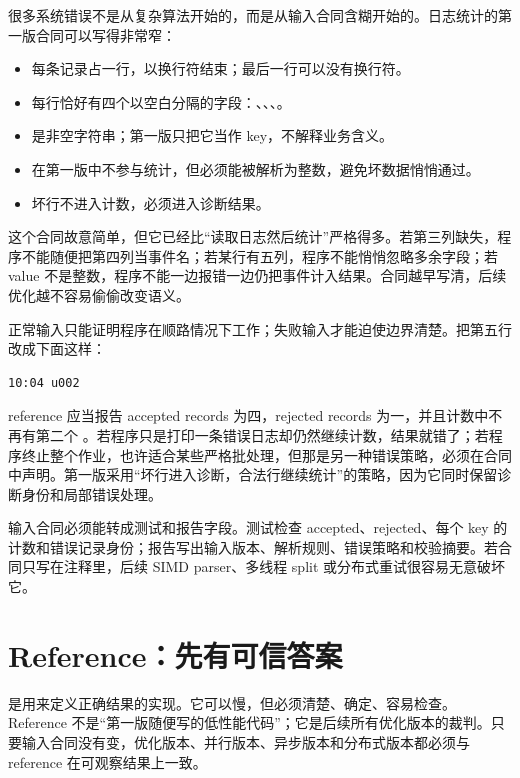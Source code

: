 很多系统错误不是从复杂算法开始的，而是从输入合同含糊开始的。日志统计的第一版合同可以写得非常窄：

\begin{itemize}
  \item 每条记录占一行，以换行符结束；最后一行可以没有换行符。
  \item 每行恰好有四个以空白分隔的字段：、、、。
  \item {} 是非空字符串；第一版只把它当作 key，不解释业务含义。
  \item {} 在第一版中不参与统计，但必须能被解析为整数，避免坏数据悄悄通过。
  \item 坏行不进入计数，必须进入诊断结果。
\end{itemize}

这个合同故意简单，但它已经比“读取日志然后统计”严格得多。若第三列缺失，程序不能随便把第四列当事件名；若某行有五列，程序不能悄悄忽略多余字段；若 value 不是整数，程序不能一边报错一边仍把事件计入结果。合同越早写清，后续优化越不容易偷偷改变语义。

正常输入只能证明程序在顺路情况下工作；失败输入才能迫使边界清楚。把第五行改成下面这样：

\begin{lstlisting}[numbers=none,caption={坏行输入}]
10:04 u002
\end{lstlisting}

reference 应当报告 accepted records 为四，rejected records 为一，并且计数中不再有第二个 。若程序只是打印一条错误日志却仍然继续计数，结果就错了；若程序终止整个作业，也许适合某些严格批处理，但那是另一种错误策略，必须在合同中声明。第一版采用“坏行进入诊断，合法行继续统计”的策略，因为它同时保留诊断身份和局部错误处理。

输入合同必须能转成测试和报告字段。测试检查 accepted、rejected、每个 key 的计数和错误记录身份；报告写出输入版本、解析规则、错误策略和校验摘要。若合同只写在注释里，后续 SIMD parser、多线程 split 或分布式重试很容易无意破坏它。

\section{Reference：先有可信答案}

 是用来定义正确结果的实现。它可以慢，但必须清楚、确定、容易检查。Reference 不是“第一版随便写的低性能代码”；它是后续所有优化版本的裁判。只要输入合同没有变，优化版本、并行版本、异步版本和分布式版本都必须与 reference 在可观察结果上一致。


